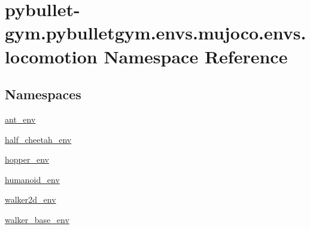 \hypertarget{namespacepybullet-gym_1_1pybulletgym_1_1envs_1_1mujoco_1_1envs_1_1locomotion}{}\section{pybullet-\/gym.pybulletgym.\+envs.\+mujoco.\+envs.\+locomotion Namespace Reference}
\label{namespacepybullet-gym_1_1pybulletgym_1_1envs_1_1mujoco_1_1envs_1_1locomotion}
\subsection*{Namespaces}
\begin{DoxyCompactItemize}
\item 
 \hyperlink{namespacepybullet-gym_1_1pybulletgym_1_1envs_1_1mujoco_1_1envs_1_1locomotion_1_1ant__env}{ant\+\_\+env}
\item 
 \hyperlink{namespacepybullet-gym_1_1pybulletgym_1_1envs_1_1mujoco_1_1envs_1_1locomotion_1_1half__cheetah__env}{half\+\_\+cheetah\+\_\+env}
\item 
 \hyperlink{namespacepybullet-gym_1_1pybulletgym_1_1envs_1_1mujoco_1_1envs_1_1locomotion_1_1hopper__env}{hopper\+\_\+env}
\item 
 \hyperlink{namespacepybullet-gym_1_1pybulletgym_1_1envs_1_1mujoco_1_1envs_1_1locomotion_1_1humanoid__env}{humanoid\+\_\+env}
\item 
 \hyperlink{namespacepybullet-gym_1_1pybulletgym_1_1envs_1_1mujoco_1_1envs_1_1locomotion_1_1walker2d__env}{walker2d\+\_\+env}
\item 
 \hyperlink{namespacepybullet-gym_1_1pybulletgym_1_1envs_1_1mujoco_1_1envs_1_1locomotion_1_1walker__base__env}{walker\+\_\+base\+\_\+env}
\end{DoxyCompactItemize}
